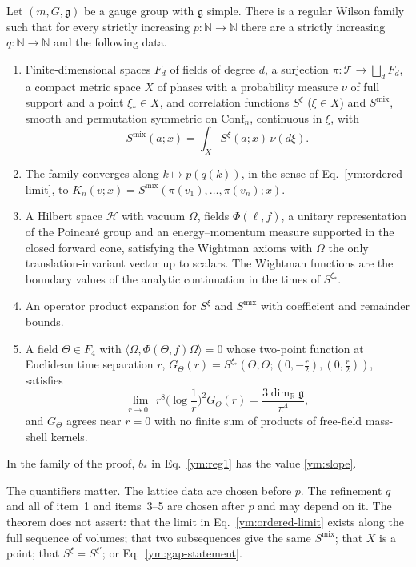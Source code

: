 \begin{theorem}\label{ym:thm:existence}
Let $(m,G,\mathfrak g)$ be a gauge group with $\mathfrak g$ simple. There is a
regular Wilson family such that for every strictly increasing
$p\colon\mathbb N\to\mathbb N$ there are a strictly increasing
$q\colon\mathbb N\to\mathbb N$ and the following data.
\begin{enumerate}
\item Finite-dimensional spaces $F_d$ of fields of degree $d$, a surjection
 $\pi\colon\mathcal T\to\bigsqcup_dF_d$, a compact metric space $X$ of phases
 with a probability measure $\nu$ of full support and a point $\xi_*\in X$,
 and correlation functions $S^\xi$ ($\xi\in X$) and $S^{\mathrm{mix}}$,
 smooth and permutation symmetric on $\mathrm{Conf}_n$, continuous in $\xi$,
 with
 \begin{equation}\label{ym:mixture}
  S^{\mathrm{mix}}(a;x)=\int_XS^\xi(a;x)\,\nu(d\xi).
 \end{equation}
\item The family converges along $k\mapsto p(q(k))$, in the sense of
 Eq.~\eqref{ym:ordered-limit}, to
 $K_n(v;x)=S^{\mathrm{mix}}(\pi(v_1),\dots,\pi(v_n);x)$.
\item A Hilbert space $\mathcal H$ with vacuum $\Omega$, fields
 $\Phi(\ell,f)$, a unitary representation of the Poincar\'e group and an
 energy--momentum measure supported in the closed forward cone, satisfying
 the Wightman axioms with $\Omega$ the only translation-invariant vector up
 to scalars. The Wightman functions are the boundary values of the analytic
 continuation in the times of $S^{\xi_*}$.
\item An operator product expansion for $S^\xi$ and $S^{\mathrm{mix}}$ with
 coefficient and remainder bounds.
\item A field $\Theta\in F_4$ with $\langle\Omega,\Phi(\Theta,f)\Omega\rangle=0$
 whose two-point function at Euclidean time separation $r$,
 $G_\Theta(r)=S^{\xi_*}(\Theta,\Theta;(0,-\tfrac r2),(0,\tfrac r2))$, satisfies
 \begin{equation}\label{ym:trace-law}
  \lim_{r\to0^+}r^8\Big(\log\frac1r\Big)^2G_\Theta(r)
  =\frac{3\dim_{\mathbb R}\mathfrak g}{\pi^4},
 \end{equation}
 and $G_\Theta$ agrees near $r=0$ with no finite sum of products of
 free-field mass-shell kernels.
\end{enumerate}
In the family of the proof, $b_*$ in Eq.~\eqref{ym:reg1} has the value
\eqref{ym:slope}.
\end{theorem}
The quantifiers matter. The lattice data are chosen before $p$. The
refinement $q$ and all of item~1 and items~3--5 are chosen after $p$ and may
depend on it. The theorem does not assert: that the limit in
Eq.~\eqref{ym:ordered-limit} exists along the full sequence of volumes; that
two subsequences give the same $S^{\mathrm{mix}}$; that $X$ is a point; that
$S^\xi=S^{\xi'}$; or Eq.~\eqref{ym:gap-statement}.

